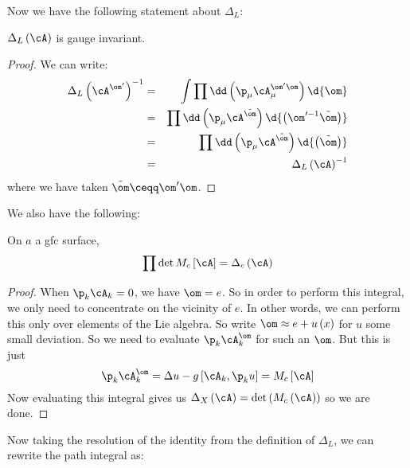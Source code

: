 \documentclass{booc}
\begin{document}
Now we have the following statement about $\Delta_L$:

\begin{prop}
$\Delta_L \left( \cA \right)$ is gauge invariant.
\end{prop}

\begin{proof}
We can write:
\begin{eqnarray}
\Delta_L\left( \cA^{\om'} \right)^{-1} &=&  
\int\prod \dd\left( \p_\mu \cA_\mu^{\om' \om} \right) \d{\om}\\
&=& \prod \dd\left( \p_\mu \cA^{\tilde \om}\right)\d{\left( \om'^{-1} \tilde \om \right)}\\
&=& \prod \dd\left( \p_\mu \cA^{\tilde \om}\right)\d{\left( \tilde \om \right)}\\
&=& \Delta_L\left( \cA \right)^{-1}
\end{eqnarray}
where we have taken $\tilde \om \ceqq \om' \om$.
\end{proof}

We also have the following:

\begin{prop}
On $a$ a gfc surface, 
\begin{equation}
\prod \det M_c\left[ \cA \right] = \Delta_c\left( \cA \right)
\end{equation}
\end{prop}
\begin{proof}
When $\p_k \cA_k = 0$, we have $\om = e$.
So in order to perform this integral, we only need to
concentrate on the vicinity of $e$. 
In other words, we can perform this only over elements of the Lie algebra. 
So write $\om \approx e + u\left( x \right)$ for $u$ some small deviation.
So we need to evaluate $\p_k \cA_k^\om$ for such an $\om$. 
But this is just
\begin{equation}
\p_k \cA_k^\om = 
\Delta u - g\left[ \cA_k , \p_k u \right] = 
M_c\left[ \cA \right]
\end{equation}
Now evaluating this integral gives us
$\Delta_X\left( \cA \right) = \det \left( M_c\left( \cA \right) \right)$
so we are done.
\end{proof}

Now taking the resolution of the identity from the definition of $\Delta_L$, 
we can rewrite the path integral as:
\end{document}
